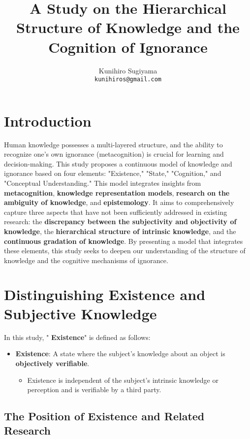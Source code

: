 \documentclass{article}
\title{A Study on the Hierarchical Structure of Knowledge and the Cognition of Ignorance}
\author{Kunihiro Sugiyama \\ \texttt{kunihiros@gmail.com}}
\date{}
\begin{document}
\maketitle

\section{Introduction}

Human knowledge possesses a multi-layered structure, and the ability to recognize one's own ignorance (metacognition) is crucial for learning and decision-making. This study proposes a continuous model of knowledge and ignorance based on four elements: "Existence," "State," "Cognition," and "Conceptual Understanding." This model integrates insights from \textbf{metacognition}, \textbf{knowledge representation models}, \textbf{research on the ambiguity of knowledge}, and \textbf{epistemology}. It aims to comprehensively capture three aspects that have not been sufficiently addressed in existing research: the \textbf{discrepancy between the subjectivity and objectivity of knowledge}, the \textbf{hierarchical structure of intrinsic knowledge}, and the \textbf{continuous gradation of knowledge}. By presenting a model that integrates these elements, this study seeks to deepen our understanding of the structure of knowledge and the cognitive mechanisms of ignorance.

\section{Distinguishing Existence and Subjective Knowledge}

In this study, " \textbf{Existence}" is defined as follows:

\begin{itemize}
    \item \textbf{Existence}: A state where the subject's knowledge about an object is \textbf{objectively verifiable}.
    \begin{itemize}
        \item Existence is independent of the subject's intrinsic knowledge or perception and is verifiable by a third party.
    \end{itemize}
\end{itemize}

\subsection{The Position of Existence and Related Research}
\end{document}
